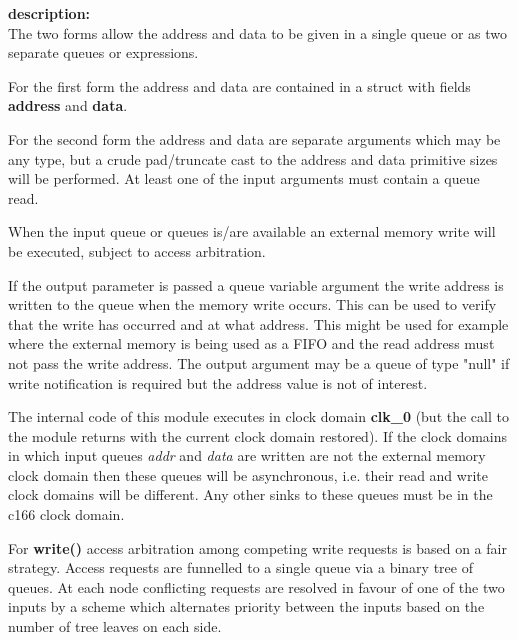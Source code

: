             {\bf description:} \\
            The two forms allow the address and data to be given in a single
            queue or as two separate queues or expressions.
            
            For the first form the address and data are contained in a
            struct with fields {\bf address} and {\bf data}.
            
            For the second form the address and data are separate arguments
            which may be any type, but a crude pad/truncate cast to the
            address and data primitive sizes will be performed. At least one of
            the input arguments must contain a queue read.
            
            When the input queue or queues is/are available an external memory
            write will be executed, subject to access arbitration.
           
            If the output parameter is passed a queue variable argument the
            write address is written to the queue when the memory write occurs.
            This can be used to verify that the write has occurred and at what
            address. This might be used for example where the external
            memory is being used as a FIFO and the read address must not
            pass the write address. The output argument may be a queue of type
            "null" if write notification is required but the address value is not
            of interest.
            
            The internal code of this module executes in clock domain {\bf clk\_0}
            (but the call to the module returns with the current clock domain
            restored). If the clock domains in which input queues {\em addr} and
            {\em data} are written are not the external memory clock domain then
            these queues will be asynchronous, i.e. their read and write clock
            domains will be different. Any other sinks to these queues must be in
            the c166 clock domain.
            
            For {\bf write()} access arbitration among competing write
            requests is based on a fair strategy. Access requests are funnelled
            to a single queue via a binary tree of queues. At each node
            conflicting requests are resolved in favour of one of the two inputs
            by a scheme which alternates priority between the inputs based on
            the number of tree leaves on each side.
            
